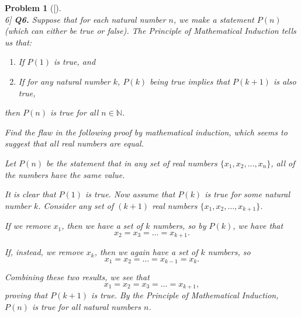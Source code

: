 \documentclass[12pt]{article}
\newtheorem{problemx}{Problem}
\newenvironment{problem}[1]{%
	\begin{problemx}[#1]\leavevmode\\[0.5em] %
	}{%
	\end{problemx}
}
\begin{document}
	\begin{problem}[6]
		\textbf{Q6.} Suppose that for each natural number $n$, we make a statement $P(n)$ (which can either be true or false). The \textit{Principle of Mathematical Induction} tells us that:
		\begin{enumerate}
			\item If $P(1)$ is true, and
			\item If for any natural number $k$, $P(k)$ being true implies that $P(k + 1)$ is also true,
		\end{enumerate}
		then $P(n)$ is true for all $n \in \mathbb{N}$.
		
		Find the flaw in the following proof by mathematical induction, which seems to suggest that all real numbers are equal.
		
		Let $P(n)$ be the statement that in any set of real numbers $\{x_1, x_2, \dots, x_n\}$, all of the numbers have the same value. 
		
		It is clear that $P(1)$ is true. Now assume that $P(k)$ is true for some natural number $k$. Consider any set of $(k+1)$ real numbers $\{x_1, x_2, \dots, x_{k+1}\}$. 
		
		If we remove $x_1$, then we have a set of $k$ numbers, so by $P(k)$, we have that 
		$$x_2 = x_3 = \dots = x_{k+1}.$$
		
		If, instead, we remove $x_k$, then we again have a set of $k$ numbers, so 
		$$x_1 = x_2 = \dots = x_{k-1} = x_k.$$
		
		Combining these two results, we see that 
		$$x_1 = x_2 = x_3 = \dots = x_{k+1},$$
		proving that $P(k+1)$ is true. By the Principle of Mathematical Induction, $P(n)$ is true for all natural numbers $n$.
	\end{problem}
	
\end{document}

